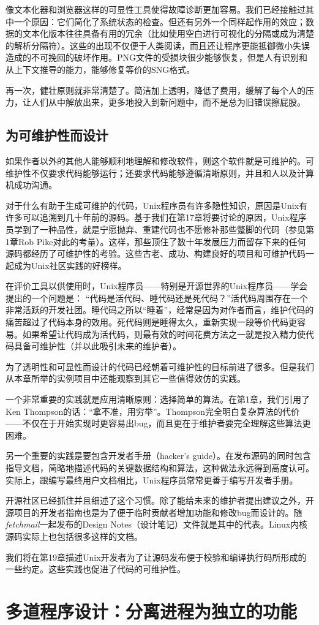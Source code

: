 \documentclass[12pt,oneside]{book}
\begin{document}
\begin{common-format}
像文本化器和浏览器这样的可显性工具使得故障诊断更加容易。我们已经接触过其中一个原因：它们简化了系统状态的检查。但还有另外一个同样起作用的效应；数据的文本化版本往往具备有用的冗余（比如使用空白进行可视化的分隔或成为清楚的解析分隔符）。这些的出现不仅便于人类阅读，而且还让程序更能抵御微小失误造成的不可挽回的破坏作用。PNG文件的受损块很少能够恢复，但是人有识别和从上下文推导的能力，能够修复等价的SNG格式。

再一次，健壮原则就非常清楚了。简洁加上透明，降低了费用，缓解了每个人的压力，让人们从中解放出来，更多地投入到新问题中，而不是总为旧错误擦屁股。

\section{为可维护性而设计}
如果作者以外的其他人能够顺利地理解和修改软件，则这个软件就是可维护的。可维护性不仅要求代码能够运行；还要求代码能够遵循清晰原则，并且和人以及计算机成功沟通。

对于什么有助于生成可维护的代码，Unix程序员有许多隐性知识，原因是Unix有许多可以追溯到几十年前的源码。基于我们在第17章将要讨论的原因，Unix程序员学到了一种品性，就是宁愿抛弃、重建代码也不愿修补那些蹩脚的代码（参见第1章Rob Pike对此的考量）。这样，那些顶住了数十年发展压力而留存下来的任何源码都经历了可维护性的考验。这些古老、成功、构建良好的项目和可维护代码一起成为Unix社区实践的好榜样。

在评价工具以供使用时，Unix程序员——特别是开源世界的Unix程序员——学会提出的一个问题是：  “代码是活代码、睡代码还是死代码？”活代码周围存在一个非常活跃的开发社团。睡代码之所以“睡着”，经常是因为对作者而言，维护代码的痛苦超过了代码本身的效用。死代码则是睡得太久，重新实现一段等价代码更容易。如果希望让代码成为活代码，则最有效的时间花费方法之一就是投入精力使代码具备可维护性（并以此吸引未来的维护者）。

为了透明性和可显性而设计的代码已经朝着可维护性的目标前进了很多。但是我们从本章所举的实例项目中还能观察到其它一些值得效仿的实践。

一个非常重要的实践就是应用清晰原则：选择简单的算法。在第1章，我们引用了Ken Thompson的话：“拿不准，用穷举”。Thompson完全明白复杂算法的代价——不仅在于开始实现时更容易出bug，而且更在于维护者要完全理解这些算法更困难。

另一个重要的实践是要包含开发者手册（hacker's guide）。在发布源码的同时包含指导文档，简略地描述代码的关键数据结构和算法，这种做法永远得到高度认可。实际上，跟编写最终用户文档相比，Unix程序员常常更善于编写开发者手册。

开源社区已经抓住并且细述了这个习惯。除了能给未来的维护者提出建议之外，开源项目的开发者指南也是为了便于临时贡献者增加功能和修改bug而设计的。随\textit{fetchmail}一起发布的Design Notes（设计笔记）文件就是其中的代表。Linux内核源码实际上也包括很多这样的文档。

我们将在第19章描述Unix开发者为了让源码发布便于校验和编译执行码所形成的一些约定。这些实践也促进了代码的可维护性。


\chapter{多道程序设计：分离进程为独立的功能}



\end{common-format}  
\end{document}
